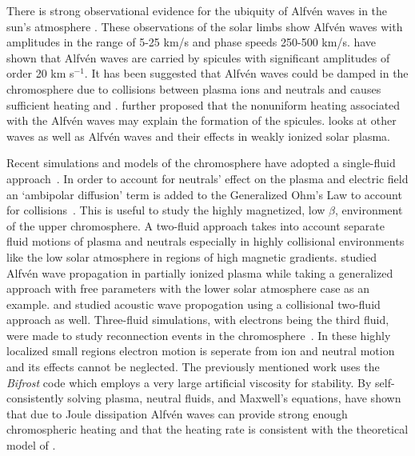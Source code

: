 \documentclass[12pt,upcase]{umlthesis}
\begin{document}
There is strong observational evidence for the ubiquity of Alfv\'en waves in the sun's atmosphere \citep{Mathioudakis2013,McIntosh2011,Jess2009,Ofman2008,Aschwanden1999,Nakariakov1999}. These observations of the solar limbs show Alfv\'en waves with amplitudes in the range of 5-25 km/s and phase speeds 250-500 km/s.  \citet{Pontieu2007} have shown that Alfv\'en waves are carried by spicules with significant amplitudes of order 20 km s$^{-1}$. It has been suggested that Alfv\'en waves could be damped in the chromosphere due to collisions between plasma ions and neutrals and causes sufficient heating \citep{Song2011} and \citep{Song2014}. \citet{Song2017} further proposed that the nonuniform heating associated with the Alfv\'en waves may explain the formation of the spicules. \citet{Khomenko2017} looks at other waves as well as Alfv\'en waves and their effects in weakly ionized solar plasma. %

Recent simulations and models of the chromosphere have adopted a single-fluid approach~\citep{Kuzma2017,Ni2016,BradyArber2016,Gudiksen2011}. In order to account for neutrals' effect on the plasma and electric field an `ambipolar diffusion' term is added to the Generalized Ohm's Law to account for collisions~\citep{Martinez-Sykora2012,Martinez-Sykora2017}. This is useful to study the highly magnetized, low $\beta$, environment of the upper chromosphere. A two-fluid approach takes into account separate fluid motions of plasma and neutrals especially in highly collisional environments like the low solar atmosphere in regions of high magnetic gradients. \citet{Soler2013} studied Alfv\'en wave propagation in partially ionized plasma while taking a generalized approach with free parameters with the lower solar atmosphere case as an example. \citet{Maneva2017} and \citet{Wojcik2018} studied acoustic wave propogation using a collisional two-fluid approach as well. Three-fluid simulations, with electrons being the third fluid, were made to study reconnection events in the chromosphere~\citep{Leake2013}. In these highly localized small regions electron motion is seperate from ion and neutral motion and its effects cannot be neglected. The previously mentioned work uses the {\it Bifrost\/} \citep{Gudiksen2011} code which employs a very large artificial viscosity for stability. By self-consistently solving plasma, neutral fluids, and Maxwell's equations, \citet{Tu2013} have shown that due to Joule dissipation Alfv\'en waves can provide strong enough chromospheric heating and that the heating rate is consistent with the theoretical model of \citet{Song2011}.
\end{document}

